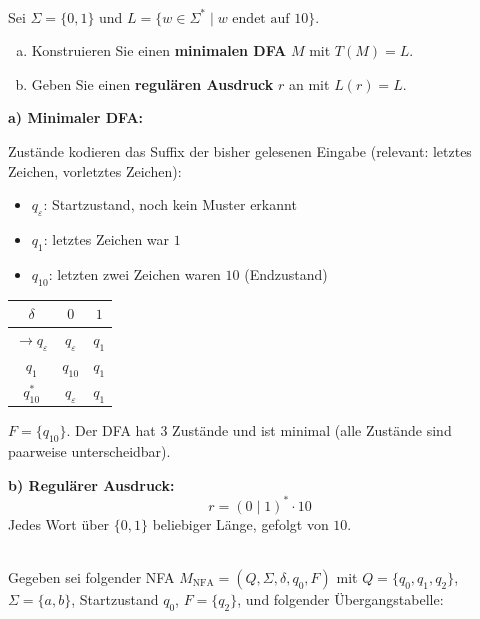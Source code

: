 \\
Sei $\Sigma = \{0, 1\}$ und $L = \{ w \in \Sigma^* \mid w \text{ endet auf } 10 \}$.
\begin{enumerate}[a)]
  \item Konstruieren Sie einen \textbf{minimalen DFA} $M$ mit $T(M) = L$.
  \item Geben Sie einen \textbf{regulären Ausdruck} $r$ an mit $L(r) = L$.
\end{enumerate}

\begin{loesung}
\textbf{a) Minimaler DFA:}

Zustände kodieren das Suffix der bisher gelesenen Eingabe (relevant: letztes Zeichen, vorletztes Zeichen):
\begin{itemize}
  \item $q_\varepsilon$: Startzustand, noch kein Muster erkannt
  \item $q_1$: letztes Zeichen war $1$
  \item $q_{10}$: letzten zwei Zeichen waren $10$ (Endzustand)
\end{itemize}

\begin{center}
\begin{tabular}{c|cc}
  $\delta$ & $0$ & $1$ \\
  \hline
  $\to q_\varepsilon$ & $q_\varepsilon$ & $q_1$ \\
  $q_1$ & $q_{10}$ & $q_1$ \\
  $q_{10}^*$ & $q_\varepsilon$ & $q_1$ \\
\end{tabular}
\end{center}

$F = \{q_{10}\}$. Der DFA hat 3 Zustände und ist minimal (alle Zustände sind paarweise unterscheidbar).

\textbf{b) Regulärer Ausdruck:}
\[
  r = (0\mid 1)^* \cdot 10
\]
Jedes Wort über $\{0,1\}$ beliebiger Länge, gefolgt von $10$.
\end{loesung}

\\
Gegeben sei folgender NFA $M_\text{NFA} = (Q, \Sigma, \delta, q_0, F)$ mit $Q = \{q_0, q_1, q_2\}$, $\Sigma = \{a,b\}$, Startzustand $q_0$, $F = \{q_2\}$, und folgender Übergangstabelle:

